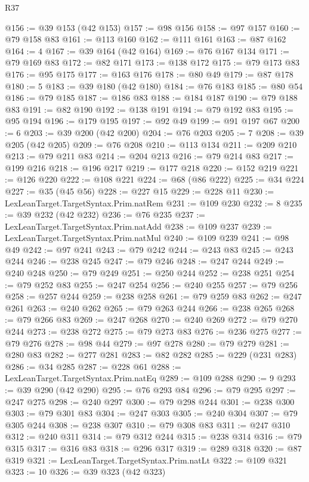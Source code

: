 \begin{lexlean}{R37}
\begin{coremodule}
@156 := @39 @153 (@42 @153)
@157 := @98 @156
@158 := @97 @157
@160 := @79 @158 @83
@161 := @113 @160
@162 := @111 @161
@163 := @87 @162
@164 := 4
@167 := @39 @164 (@42 @164)
@169 := @76 @167 @134
@171 := @79 @169 @83
@172 := @82 @171
@173 := @138 @172
@175 := @79 @173 @83
@176 := @95 @175
@177 := @163 @176
@178 := @80 @49
@179 := @87 @178
@180 := 5
@183 := @39 @180 (@42 @180)
@184 := @76 @183
@185 := @80 @54
@186 := @79 @185
@187 := @186 @83
@188 := @184 @187
@190 := @79 @188 @83
@191 := @82 @190
@192 := @138 @191
@194 := @79 @192 @83
@195 := @95 @194
@196 := @179 @195
@197 := @92 @49
@199 := @91 @197 @67
@200 := 6
@203 := @39 @200 (@42 @200)
@204 := @76 @203
@205 := 7
@208 := @39 @205 (@42 @205)
@209 := @76 @208
@210 := @113 @134
@211 := @209 @210
@213 := @79 @211 @83
@214 := @204 @213
@216 := @79 @214 @83
@217 := @199 @216
@218 := @196 @217
@219 := @177 @218
@220 := @152 @219
@221 := @126 @220
@222 := @108 @221
@224 := @68 (@86 @222)
@225 := @34 @224
@227 := @35 (@45 @56)
@228 := @227 @15
@229 := @228 @11
@230 := LexLeanTarget.TargetSyntax.Prim.natRem
@231 := @109 @230
@232 := 8
@235 := @39 @232 (@42 @232)
@236 := @76 @235
@237 := LexLeanTarget.TargetSyntax.Prim.natAdd
@238 := @109 @237
@239 := LexLeanTarget.TargetSyntax.Prim.natMul
@240 := @109 @239
@241 := @98 @49
@242 := @97 @241
@243 := @79 @242
@244 := @243 @83
@245 := @243 @244
@246 := @238 @245
@247 := @79 @246
@248 := @247 @244
@249 := @240 @248
@250 := @79 @249
@251 := @250 @244
@252 := @238 @251
@254 := @79 @252 @83
@255 := @247 @254
@256 := @240 @255
@257 := @79 @256
@258 := @257 @244
@259 := @238 @258
@261 := @79 @259 @83
@262 := @247 @261
@263 := @240 @262
@265 := @79 @263 @244
@266 := @238 @265
@268 := @79 @266 @83
@269 := @247 @268
@270 := @240 @269
@272 := @79 @270 @244
@273 := @238 @272
@275 := @79 @273 @83
@276 := @236 @275
@277 := @79 @276
@278 := @98 @44
@279 := @97 @278
@280 := @79 @279
@281 := @280 @83
@282 := @277 @281
@283 := @82 @282
@285 := @229 (@231 @283)
@286 := @34 @285
@287 := @228 @61
@288 := LexLeanTarget.TargetSyntax.Prim.natEq
@289 := @109 @288
@290 := 9
@293 := @39 @290 (@42 @290)
@295 := @76 @293 @84
@296 := @79 @295
@297 := @247 @275
@298 := @240 @297
@300 := @79 @298 @244
@301 := @238 @300
@303 := @79 @301 @83
@304 := @247 @303
@305 := @240 @304
@307 := @79 @305 @244
@308 := @238 @307
@310 := @79 @308 @83
@311 := @247 @310
@312 := @240 @311
@314 := @79 @312 @244
@315 := @238 @314
@316 := @79 @315
@317 := @316 @83
@318 := @296 @317
@319 := @289 @318
@320 := @87 @319
@321 := LexLeanTarget.TargetSyntax.Prim.natLt
@322 := @109 @321
@323 := 10
@326 := @39 @323 (@42 @323)

\end{coremodule}
\end{lexlean}
